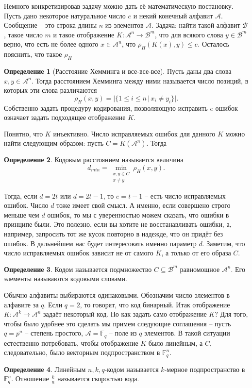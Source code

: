\documentclass[10pt,a4paper,oneside]{book}
\theoremstyle{definition}
\newtheorem*{defn}{{\color{yellow!30!red} Определение}}
\newcommand{\mb}[1]{\mathbb{#1}}
\newcommand{\mc}[1]{\mathcal{#1}}
\def\dfn{\begin{defn}}
\def\edfn{\end{defn}}
\begin{document}
Немного конкретизировав задачу можно дать её математическую постановку. Пусть дано некоторое натуральное число $e$ и некий конечный алфавит $\mc A$. Сообщение -- это строка длины $n$ из элементов $\mc A$. Задача: найти такой алфавит $\mc B$, такое число $m$ и такое отображение $K\colon \mc A^n \to \mc B^m$, что для всякого слова $y \in \mc B^m$ верно, что есть не более одного $x \in \mc A^n$, что $\rho_H(K(x),y) \leq e$. Осталось пояснить, что такое $\rho_H$

\dfn[Расстояние Хемминга и все-все-все] Пусть даны два слова $x,y \in \mc A^n$. Тогда расстоянием Хемминга между ними называется число позиций, в которых эти слова различаются
$$\rho_H(x,y)=|\{1\leq i \leq n \, |\, x_i \neq y_i \}|.$$
Собственно задать процедуру кодирования, позволяющую исправить $e$ ошибок означает задать подходящее отображение $K$. 
\edfn

Понятно, что $K$ инъективно. Число исправляемых ошибок для данного $K$ можно найти следующим образом: пусть $C=K(\mc A^n)$. Тогда

\dfn Кодовым расстоянием называется величина
$$d_{min}= \min_{\substack{x,y\in C \\ x \neq y}} \rho_H(x,y).$$
\edfn

Тогда, если $d=2t$ или $d=2t-1$, то $e=t-1$ -- есть число исправляемых ошибок. Число $d$ тоже имеет свой смысл. А именно, если совершено строго меньше чем $d$ ошибок, то мы с уверенностью можем сказать, что ошибки в принципе были. Это полезно, если вы хотите не восстанавливать ошибки, а, например, запросить тот же кусок повторно в надежде, что он придёт без ошибок. В дальнейшем нас будет интересовать именно параметр $d$. Заметим, что число исправляемых ошибок зависит не от самого $K$, а только от его образа $C$.

\dfn Кодом называется подмножество $C \subseteq \mc B^m$ равномощное $\mc A^n$. Его элементы называются кодовыми словами.
\edfn

Обычно алфавиты выбираются одинаковыми. Обозначим число элементов в алфавите за $q$. Если $q=2$, то говорят, что код бинарный. Итак отображение $K \colon \mc A^k \to \mc A^n$ задаёт некоторый код. Но как задать само отображение $K$? Для того, чтобы было удобнее это сделать мы примем следующие соглашения -- пусть $q=p^n$ -- степень простого, $\mc A = \mb F_q$ -- поле из $q$ элементов. В такой ситуации естественно потребовать, чтобы отображение $K$ было линейным, а $C$, следовательно, было векторным подпространством в $\mb F_q^n$.

\dfn Линейным $n,k,q$-кодом называется $k$-мерное подпространство в $\mb F_q^n$. Отношение $\frac{k}{n}$ называется скоростью кода.
\edfn
\end{document}
